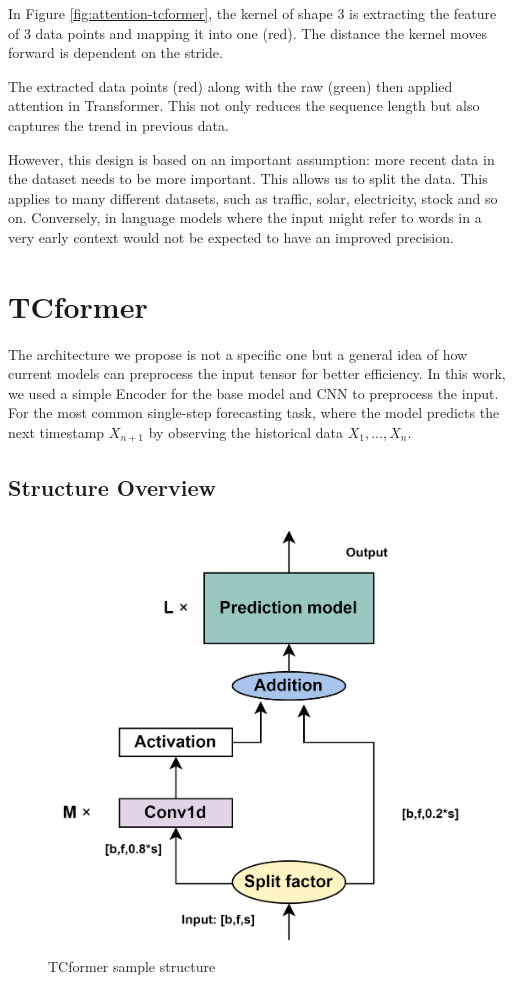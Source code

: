 \documentclass[stu,12pt,floatsintext]{apa7}
\begin{document}
In Figure \ref{fig:attention-tcformer}, the kernel of shape 3 is extracting the feature of 3 data points and mapping it into one (red). The distance the kernel moves forward is dependent on the stride. 

The extracted data points (red) along with the raw (green) then applied attention in Transformer. This not only reduces the sequence length but also captures the trend in previous data.

However, this design is based on an important assumption: more recent data in the dataset needs to be more important. This allows us to split the data. This applies to many different datasets, such as traffic, solar, electricity, stock and so on. Conversely, in language models where the input might refer to words in a very early context would not be expected to have an improved precision. 


\section{TCformer}

The architecture we propose is not a specific one but a general idea of how current models can preprocess the input tensor for better efficiency. In this work, we used a simple Encoder for the base model and CNN to preprocess the input. For the most common single-step forecasting task, where the model predicts the next timestamp $X_{n+1}$ by observing the historical data $X_1,..., X_n$.

\subsection{Structure Overview}

\begin{figure}[H]
    \centering
    \includegraphics[width=0.8\linewidth]{images/StructureDiagram.drawio.png}
    \caption{TCformer sample structure}
    \label{fig:TCformer-structure}
\end{figure}
\end{document}
